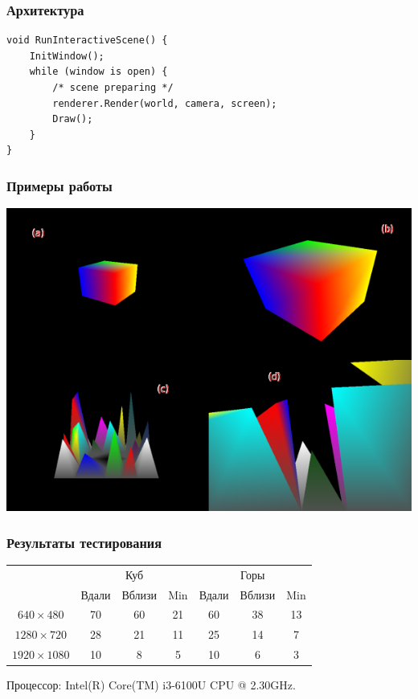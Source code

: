 \documentclass{beamer}
\begin{document}
\begin{frame}[fragile]
\frametitle{Архитектура}


\begin{lstlisting}
void RunInteractiveScene() {
    InitWindow();
    while (window is open) {
        /* scene preparing */
        renderer.Render(world, camera, screen);
        Draw();
    }
}
\end{lstlisting}
\end{frame}

\begin{frame}
\frametitle{Примеры работы}

\begin{center}
	\includegraphics[scale = 0.3]{rendered models.png}
\end{center}
\end{frame}

\begin{frame}
\frametitle{Результаты тестирования}

\begin{center}
	\begin{tabular}{|c|c|c|c|c|c|c|} \cline{2-7}
		\multicolumn{1}{c|}{} & \multicolumn{3}{|c|}{Куб} & \multicolumn{3}{|c|}{Горы} \\ \cline{2-7}
		\multicolumn{1}{c|}{} & Вдали & Вблизи & Min & Вдали & Вблизи & Min \\ \hline
		$640 \times 480$ & 70 & 60 & 21 & 60 & 38 & 13 \\ \hline
		$1280 \times 720$ & 28 & 21 & 11 & 25 & 14 & 7 \\ \hline
		$1920 \times 1080$ & 10 & 8 & 5 & 10 & 6 & 3 \\ \hline
\end{tabular}
\end{center}

Процессор: Intel(R) Core(TM) i3-6100U CPU @ 2.30GHz.

\end{frame}
\end{document}
